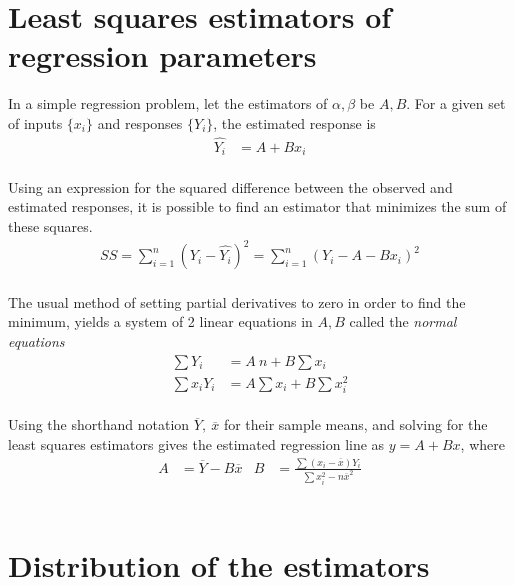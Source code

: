 \section{Least squares estimators of regression parameters}

In a simple regression problem, let the estimators of $ \alpha, \beta $ be $ A, B $. For a given set of inputs $ \{x_i\} $ and responses $ \{Y_i\} $, the estimated response is \\

\begin{align}
	\widehat{Y_i} &= A + Bx_i
\end{align}\\

Using an expression for the squared difference between the observed and estimated responses, it is possible to find an estimator that minimizes the sum of these squares.\\

\begin{align}
	SS = \sum\limits_{i = 1}^{n} (Y_i - \widehat{Y_i})^2 = \sum\limits_{i = 1}^{n} (Y_i - A - Bx_i)^2
\end{align}\\

The usual method of setting partial derivatives to zero in order to find the minimum, yields a system of 2 linear equations in $ A, B $ called the \textit{normal equations} \\

\begin{align}
	\sum Y_i & = A\ n +B \sum x_i\\
	\sum x_i Y_i & = A \sum x_i +B \sum x_i^2
\end{align}\\

Using the shorthand notation $ \overline{Y},\ \overline{x} $ for their sample means, and solving for the least squares estimators gives the estimated regression line as $ y = A + Bx $, where \\

\begin{align}
	A &= \overline{Y} - B \overline{x} & B &= \frac{\sum (x_i - \overline{x}) Y_i}{\sum x_i^2  - n\overline{x}^2 }
\end{align}\\

\section{Distribution of the estimators}

